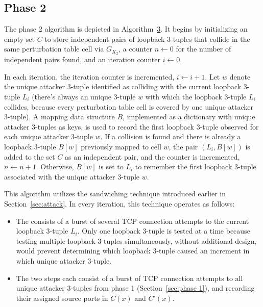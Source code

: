 \documentclass[twocolumn]{report}
\begin{document}
\vspace{0.2cm}


\subsection{Phase 2}
\label{sec:phase 2}

The phase 2 algorithm is depicted in Algorithm~\hyperref[alg:phase2]{3}. It begins by initializing an empty set $C$ to store \alert{independent pairs of loopback 3-tuples} that collide in the same perturbation table cell via $G_{K_2}$, a counter $n \leftarrow 0$ for the \alert{number of independent pairs found}, and an \alert{iteration counter} $i \leftarrow 0$.

In each iteration, the iteration counter is incremented, \(i \leftarrow i+1\). Let \(w\) denote the unique attacker 3-tuple identified as colliding with the current loopback 3-tuple \(L_i\) (there's always an unique 3-tuple \(w\) with which the loopback 3-tuple $L_i$ collides, because every perturbation table cell is covered by one unique attacker 3-tuple). A mapping data structure \(B\), implemented as a \alert{dictionary} with unique attacker 3-tuples as keys, is used to record the first loopback 3-tuple observed for each unique attacker 3-tuple \(w\). \alert{If a collision is found} and there is already a loopback 3-tuple \(B[w]\) previously mapped to cell \(w\), the pair \((L_i, B[w])\) is added to the set \(C\) as an independent pair, and the counter is incremented, \(n \leftarrow n+1\). \alert{Otherwise}, \(B[w]\) is set to \(L_i\) to remember the first loopback 3-tuple associated with the unique attacker 3-tuple \(w\).

This algorithm utilizes the \alert{sandwiching technique} introduced earlier in Section~\ref{sec:attack}. In every iteration, this technique operates as follows:
\begin{itemize}
	\item The  consists of a burst of several TCP connection attempts to the current loopback 3-tuple $L_i$. Only one loopback 3-tuple is tested at a time because testing multiple loopback 3-tuples simultaneously, without additional design, would prevent determining which loopback 3-tuple caused an increment in which unique attacker 3-tuple.
	\item The two  steps each consist of a burst of TCP connection attempts to all unique attacker 3-tuples from phase 1 (Section~\ref{sec:phase 1}), and recording their assigned source ports in $C(x)$ and $C'(x)$.
\end{itemize}
\end{document}
